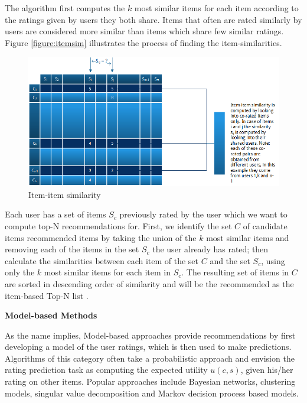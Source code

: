 The algorithm first computes the $k$ most similar items for each item according to the ratings given by users they both share. Items that often are rated similarly by users are considered more similar than items which share few similar ratings. Figure \ref{figure:itemsim} illustrates the process of finding the item-similarities.

\begin{figure}[H]
    \includegraphics[width=5in]{image/itemsim.png}
    \centering
    \caption[Item-item similarity]{Item-item similarity}
    \label{figure:ratingmatrix}
\end{figure}

Each user has a set of items $S_{c}$ previously rated by the user which we want to compute top-N recommendations for. First, we identify the set $C$ of candidate items recommended items by taking the union of the $k$ most similar items and removing each of the items in the set $S_{c}$ the user already has rated; then calculate the similarities between each item of the set $C$ and the set $S_{c}$, using only the $k$ most similar items for each item in $S_{c}$. The resulting set of items in $C$ are sorted in descending order of similarity and will be the recommended as the item-based Top-N list \cite{Karypis2001}.\linebreak[4]

\textbf{Model-based Methods}

As the name implies, Model-based approaches provide recommendations by first developing a model of the user ratings, which is then used to make predictions. Algorithms of this category often take a probabilistic approach and envision the rating prediction task as computing the expected utility $u(c,s)$, given his/her rating on other items. Popular approaches include Bayesian networks, clustering models, singular value decomposition and Markov decision process based models.

